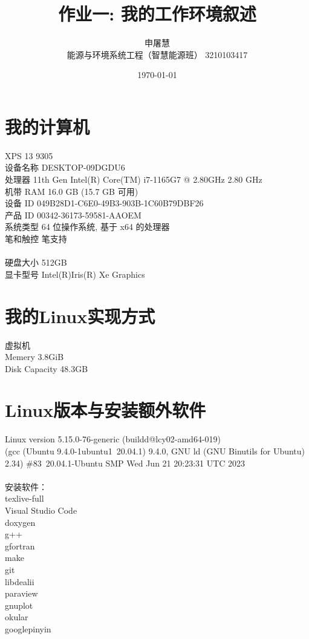\documentclass{ctexart}
\title{作业一: 我的工作环境叙述}
\author{申屠慧 \\ 能源与环境系统工程（智慧能源班） 3210103417}
\date{\today}
\begin{document}
\maketitle


\section{我的计算机}
\noindent
XPS 13 9305\\
设备名称	DESKTOP-09DGDU6\\
处理器	11th Gen Intel(R) Core(TM) i7-1165G7 @ 2.80GHz   2.80 GHz\\
机带 RAM	16.0 GB (15.7 GB 可用)\\
设备 ID	049B28D1-C6E0-49B3-903B-1C60B79DBF26\\
产品 ID	00342-36173-59581-AAOEM\\
系统类型	64 位操作系统, 基于 x64 的处理器\\
笔和触控	笔支持\\
\\
硬盘大小 512GB\\
显卡型号 Intel(R)Iris(R) Xe Graphics\@

\section{我的Linux实现方式}
\noindent
虚拟机\\
Memery 3.8GiB\\
Disk Capacity 48.3GB\\  

\section{Linux版本与安装额外软件}
\noindent
Linux version 5.15.0-76-generic (buildd@lcy02-amd64-019)\\
 (gcc (Ubuntu 9.4.0-1ubuntu1~20.04.1) 9.4.0, 
 GNU ld (GNU Binutils for Ubuntu) 2.34) \#83~20.04.1-Ubuntu SMP Wed Jun 21 20:23:31 UTC 2023\\
 \\
安装软件：\\
texlive-full\\
Visual Studio Code\\
doxygen\\
g++\\
gfortran\\
make\\
git\\
libdealii\\
paraview\\
gnuplot\\
okular\\
googlepinyin\\
\end{document}
